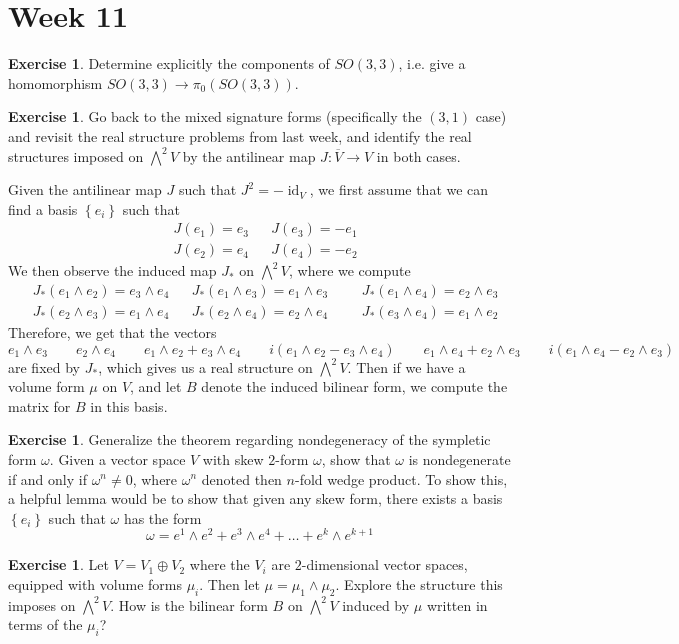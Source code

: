 \documentclass[psamsfonts]{amsart}
\theoremstyle{definition}
\newtheorem{exer}[thm]{Exercise}
\theoremstyle{remark}
\newcommand{\set}[1]{\left\lbrace #1 \right\rbrace}
\DeclareMathOperator{\id}{id}
\begin{document}
\section*{Week 11}
%
\begin{exer}
Determine explicitly the components of $SO(3,3)$, i.e. give a homomorphism $SO(3,3) \to \pi_0(SO(3,3))$.
\end{exer}
%
\begin{exer}
Go back to the mixed signature forms (specifically the $(3,1)$ case) and revisit the real structure problems from last week, and identify the real structures imposed on $\bigwedge^2 V$ by the antilinear map $J : \overline{V} \to V$ in both cases.
\end{exer}
Given the antilinear map $J$ such that $J^2 = -\id_V$, we first assume that we can find a basis $\set{e_i}$ such that 
\begin{align*}
&J(e_1) = e_3 && J(e_3) = -e_1 \\
&J(e_2) = e_4 && J(e_4) = -e_2
\end{align*}
We then observe the induced map $J_*$ on $\bigwedge^2V$, where we compute
\begin{align*}
& J_*(e_1 \wedge e_2) = e_3 \wedge e_4 && J_*(e_1 \wedge e_3) = e_1 \wedge e_3 &&& J_*(e_1 \wedge e_4) = e_2 \wedge e_3 \\
&J_*(e_2 \wedge e_3) = e_1 \wedge e_4 &&J_*(e_2 \wedge e_4) = e_2 \wedge e_4 &&&J_*(e_3 \wedge e_4) = e_1 \wedge e_2
\end{align*}
Therefore, we get that the vectors 
$$e_1 \wedge e_3 \qquad e_2 \wedge e_4 \qquad e_1 \wedge e_2 + e_3 \wedge e_4 \qquad i(e_1 \wedge e_2 - e_3 \wedge e_4) \qquad e_1 \wedge e_4 + e_2 \wedge e_3 \qquad i(e_1 \wedge e_4 - e_2 \wedge e_3)$$
are fixed by $J_*$, which gives us a real structure on $\bigwedge^2V$. Then if we have a volume form $\mu$ on $V$, and let $B$ denote the induced bilinear form, we compute the matrix for $B$ in this basis.
%
\begin{exer}
Generalize the theorem regarding nondegeneracy of the sympletic form $\omega$. Given a vector space $V$ with skew $2$-form $\omega$, show that $\omega$ is nondegenerate if and only if $\omega^n \neq 0$, where $\omega^n$ denoted then $n$-fold wedge product. To show this, a helpful lemma would be to show that given any skew form, there exists a basis $\set{e_i}$ such that $\omega$ has the form
$$\omega = e^1 \wedge e^2 + e^3 \wedge e^4 + \ldots  + e^k \wedge e^{k+1}$$
\end{exer}
%
\begin{exer}
Let $V = V_1 \oplus V_2$ where the $V_i$ are $2$-dimensional vector spaces, equipped with volume forms $\mu_i$. Then let $\mu = \mu_1 \wedge \mu_2$. Explore the structure this imposes on $\bigwedge^2V$. How is the bilinear form $B$ on $\bigwedge^2V$ induced by $\mu$ written in terms of the $\mu_i$?
\end{exer}
\end{document}
